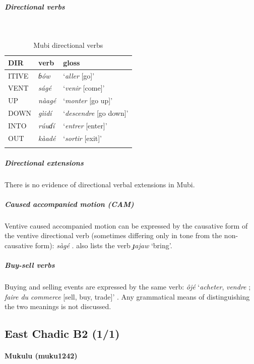 \subparagraph{Directional verbs}~

\begin{table}[H]
	\caption{Mubi directional verbs} 
	\label{tab:mubiV}
	\begin{tabular}{lll} %
		\lsptoprule
		DIR & verb & gloss   \\ %
		\midrule
		ITIVE & \textit{ɓów} & `\textit{aller} [go]' \\
		VENT & \textit{ságé} & `\textit{venir} [come]' \\
		UP  & \textit{nàagé} & `\textit{monter} [go up]' \\
		DOWN & \textit{gìidí} & `\textit{descendre} [go down]' \\ 
		INTO& \textit{rúuɗí} & `\textit{entrer} [enter]' \\
		OUT & \textit{kàadé} & `\textit{sortir} [exit]' \\
		\lspbottomrule
	\end{tabular}
\end{table}

\subparagraph{Directional extensions}

There is no evidence of directional verbal extensions in Mubi. 

\subparagraph{Caused accompanied motion (CAM)}

Ventive caused accompanied motion can be expressed by the causative form of the ventive directional verb (sometimes differing only in tone from the non-causative form): \textit{sàgé} \citep[85, 95]{jungraithmayrLangueMubiKaan2013}. \citet[118]{prickettPhonologyMorphologyVerb2012} also lists the verb \textit{ɟajaw} `bring'. 

\subparagraph{Buy-sell verbs}

Buying and selling events are expressed by the same verb:  \textit{ôjé} `\textit{acheter}, \textit{vendre} ; \textit{faire du commerce} [sell, buy, trade]' \citep[192]{jungraithmayrLangueMubiKaan2013}. Any grammatical means of distinguishing the two meanings is not discussed. 

\subsection{East Chadic B2 (1/1)}

\paragraph*{Mukulu (muku1242)}

